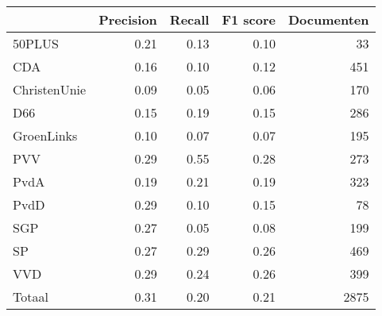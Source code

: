 \begin{tabular}{lrrrr}
\toprule
{} &  Precision &  Recall &  F1 score &  Documenten \\
\midrule
50PLUS       &       0.21 &    0.13 &      0.10 &          33 \\
CDA          &       0.16 &    0.10 &      0.12 &         451 \\
ChristenUnie &       0.09 &    0.05 &      0.06 &         170 \\
D66          &       0.15 &    0.19 &      0.15 &         286 \\
GroenLinks   &       0.10 &    0.07 &      0.07 &         195 \\
PVV          &       0.29 &    0.55 &      0.28 &         273 \\
PvdA         &       0.19 &    0.21 &      0.19 &         323 \\
PvdD         &       0.29 &    0.10 &      0.15 &          78 \\
SGP          &       0.27 &    0.05 &      0.08 &         199 \\
SP           &       0.27 &    0.29 &      0.26 &         469 \\
VVD          &       0.29 &    0.24 &      0.26 &         399 \\
Totaal       &       0.31 &    0.20 &      0.21 &        2875 \\
\bottomrule
\end{tabular}
